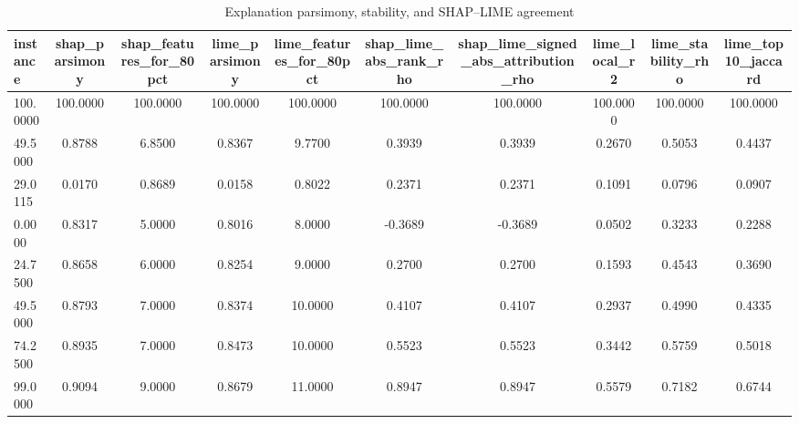 \begin{table}
\centering
\caption{Explanation parsimony, stability, and SHAP--LIME agreement}
\label{tab:explanation_quality}
\begin{tabular}{lccccccccc}
\toprule
instance & shap_parsimony & shap_features_for_80pct & lime_parsimony & lime_features_for_80pct & shap_lime_abs_rank_rho & shap_lime_signed_abs_attribution_rho & lime_local_r2 & lime_stability_rho & lime_top10_jaccard \\
\midrule
100.0000 & 100.0000 & 100.0000 & 100.0000 & 100.0000 & 100.0000 & 100.0000 & 100.0000 & 100.0000 & 100.0000 \\
49.5000 & 0.8788 & 6.8500 & 0.8367 & 9.7700 & 0.3939 & 0.3939 & 0.2670 & 0.5053 & 0.4437 \\
29.0115 & 0.0170 & 0.8689 & 0.0158 & 0.8022 & 0.2371 & 0.2371 & 0.1091 & 0.0796 & 0.0907 \\
0.0000 & 0.8317 & 5.0000 & 0.8016 & 8.0000 & -0.3689 & -0.3689 & 0.0502 & 0.3233 & 0.2288 \\
24.7500 & 0.8658 & 6.0000 & 0.8254 & 9.0000 & 0.2700 & 0.2700 & 0.1593 & 0.4543 & 0.3690 \\
49.5000 & 0.8793 & 7.0000 & 0.8374 & 10.0000 & 0.4107 & 0.4107 & 0.2937 & 0.4990 & 0.4335 \\
74.2500 & 0.8935 & 7.0000 & 0.8473 & 10.0000 & 0.5523 & 0.5523 & 0.3442 & 0.5759 & 0.5018 \\
99.0000 & 0.9094 & 9.0000 & 0.8679 & 11.0000 & 0.8947 & 0.8947 & 0.5579 & 0.7182 & 0.6744 \\
\bottomrule
\end{tabular}
\end{table}
